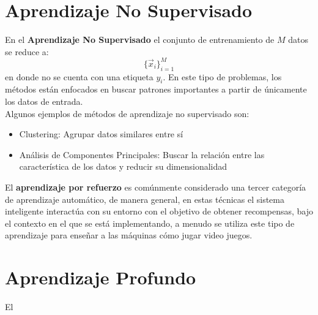 \section{Aprendizaje No Supervisado}
En el \textbf{Aprendizaje No Supervisado} el conjunto de entrenamiento de $M$ datos se reduce a:
\[ \{\vec{x}_i\}_{i=1}^M \]
en donde no se cuenta con una etiqueta $y_i$. En este tipo de problemas, los métodos están enfocados en buscar patrones importantes a partir de únicamente los datos de entrada.
\\
Algunos ejemplos de métodos de aprendizaje no supervisado son:
\begin{itemize}[label=\textcolor{CTtitle}{\textbullet}]
\item Clustering: Agrupar datos similares entre sí
\item Análisis de Componentes Principales: Buscar la relación entre las característica de los datos y reducir su dimensionalidad
\end{itemize}

El \textbf{aprendizaje por refuerzo} es comúnmente considerado una tercer categoría de aprendizaje automático, de manera general, en estas técnicas el sistema inteligente interactúa con su entorno con el objetivo de obtener recompensas, bajo el contexto en el que se está implementando, a menudo se utiliza este tipo de aprendizaje para enseñar a las máquinas cómo jugar video juegos. \cite{Ivan:2019}

\section{Aprendizaje Profundo}
El 





